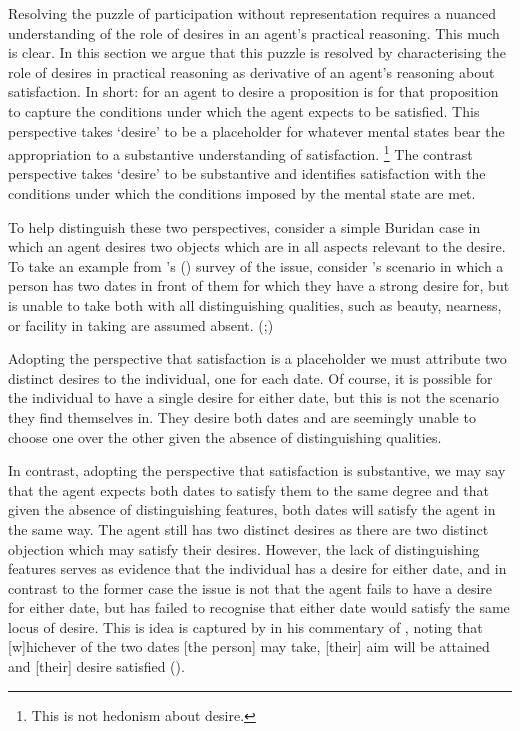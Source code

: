 \documentclass[10pt]{article}
\begin{document}
Resolving the puzzle of participation without representation requires a nuanced understanding of the role of desires in an agent's practical reasoning.
This much is clear.
In this section we argue that this puzzle is resolved by characterising the role of desires in practical reasoning as derivative of an agent's reasoning about satisfaction.
In short: for an agent to desire a proposition is for that proposition to capture the conditions under which the agent expects to be satisfied.
This perspective takes `desire' to be a placeholder for whatever mental states bear the appropriation to a substantive understanding of satisfaction.\nolinebreak
\footnote{\color{red} This is not hedonism about desire.}
The contrast perspective takes `desire' to be substantive and identifies satisfaction with the conditions under which the conditions imposed by the mental state are met.

To help distinguish these two perspectives, consider a simple Buridan case in which an agent desires two objects which are in all aspects relevant to the desire.
To take an example from \citeauthor{Rescher:1960aa}'s (\citeyear{Rescher:1960aa}) survey of the issue, consider \citeauthor{Al-Ghazali:1963aa}'s scenario in which a person has two dates in front of them for which they have a strong desire for, but is unable to take both with all distinguishing qualities, such as beauty, nearness, or facility in taking are assumed absent.
(\citeyear[26--27]{Al-Ghazali:1963aa};\citeyear[147--148]{Rescher:1960aa})

Adopting the perspective that satisfaction is a placeholder we must attribute two distinct desires to the individual, one for each date.
Of course, it is possible for the individual to have a single desire for either date, but this is not the scenario they find themselves in.
They desire both dates and are seemingly unable to choose one over the other given the absence of distinguishing qualities.

In contrast, adopting the perspective that satisfaction is substantive, we may say that the agent expects both dates to satisfy them to the same degree and that  given the absence of distinguishing features, both dates will satisfy the agent in the same way.
The agent still has two distinct desires as there are two distinct objection which may satisfy their desires.
However, the lack of distinguishing features serves as evidence that the individual has a desire for either date, and in contrast to the former case the issue is not that the agent fails to have a desire for either date, but has failed to recognise that either date would satisfy the same locus of desire.
This is idea is captured by \citeauthor{Averroes:1954aa} in his commentary of \citeauthor{Al-Ghazali:1963aa}, noting that [w]hichever of the two dates [the person] may take, [their] aim will be attained and [their] desire satisfied (\citeyear[23]{Averroes:1954aa}).
\end{document}
